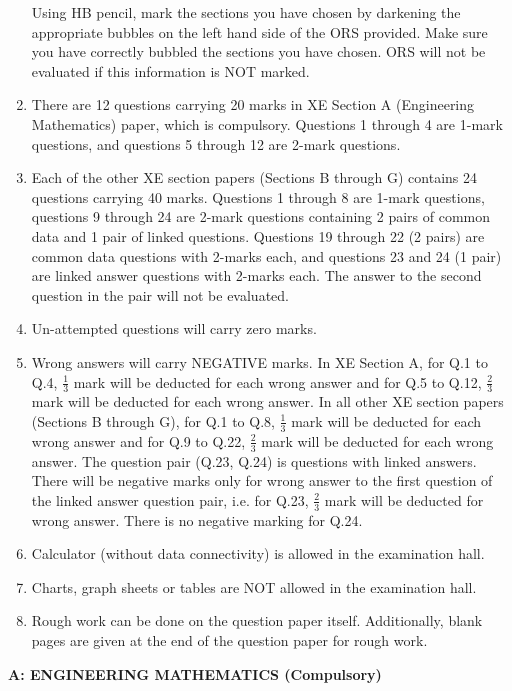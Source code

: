 \documentclass[journal,12pt,onecolumn]{IEEEtran}
\theoremstyle{remark}
\begin{document}
\begin{enumerate}
    Using HB pencil, mark the sections you have chosen by darkening the appropriate bubbles on the left hand side of the ORS provided. Make sure you have correctly bubbled the sections you have chosen. ORS will not be evaluated if this information is NOT marked.
    \item There are 12 questions carrying 20 marks in XE Section A (Engineering Mathematics) paper, which is compulsory. Questions 1 through 4 are 1-mark questions, and questions 5 through 12 are 2-mark questions.
    \item Each of the other XE section papers (Sections B through G) contains 24 questions carrying 40 marks. Questions 1 through 8 are 1-mark questions, questions 9 through 24 are 2-mark questions containing 2 pairs of common data and 1 pair of linked questions. Questions 19 through 22 (2 pairs) are common data questions with 2-marks each, and questions 23 and 24 (1 pair) are linked answer questions with 2-marks each. The answer to the second question in the pair will not be evaluated.\item Un-attempted questions will carry zero marks.
    \item Wrong answers will carry NEGATIVE marks. In XE Section A, for Q.1 to Q.4, $\frac{1}{3}$ mark will be deducted for each wrong answer and for Q.5 to Q.12, $\frac{2}{3}$ mark will be deducted for each wrong answer. In all other XE section papers (Sections B through G), for Q.1 to Q.8, $\frac{1}{3}$ mark will be deducted for each wrong answer and for Q.9 to Q.22, $\frac{2}{3}$ mark will be deducted for each wrong answer. The question pair (Q.23, Q.24) is questions with linked answers. There will be negative marks only for wrong answer to the first question of the linked answer question pair, i.e. for Q.23, $\frac{2}{3}$ mark will be deducted for wrong answer. There is no negative marking for Q.24.
    \item Calculator (without data connectivity) is allowed in the examination hall.
    \item Charts, graph sheets or tables are NOT allowed in the examination hall.
    \item Rough work can be done on the question paper itself. Additionally, blank pages are given at the end of the question paper for rough work.
    \end{enumerate}
\textbf{A: ENGINEERING MATHEMATICS (Compulsory)}

\vspace{0.5cm}
\end{document}
